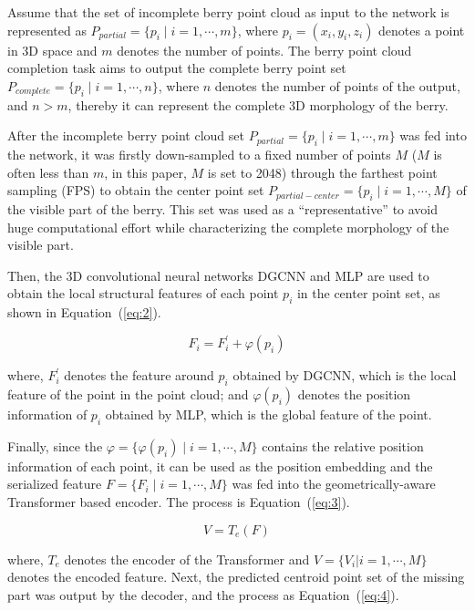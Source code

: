 \documentclass[12pt]{article}
\begin{document}
Assume that the set of incomplete berry point cloud as input to the network is represented as $P_{partial}=\{p_i \mid i=1, \cdots, m \}$, where $p_i=(x_i,y_i,z_i)$ denotes a point in 3D space and $m$ denotes the number of points. 
The berry point cloud completion task aims to output the complete berry point set $P_{complete}=\{p_i \mid i=1, \cdots, n\}$, where $n$ denotes the number of points of the output, and $n > m$, thereby it can represent the complete 3D morphology of the berry.

After the incomplete berry point cloud set $P_{partial}=\{p_i \mid i=1,\cdots,m\}$ was fed into the network, it was firstly down-sampled to a fixed number of points $M$ ($M$ is often less than $m$, in this paper, $M$ is set to 2048) through the farthest point sampling (FPS) to obtain the center point set $P_{partial-center}=\{p_i \mid i=1, \cdots, M\}$ of the visible part of the berry. 
This set was used as a ``representative'' to avoid huge computational effort while characterizing the complete morphology of the visible part.

Then, the 3D convolutional neural networks DGCNN \citep{wang_dynamic_2019} and MLP \citep{tolstikhin_mlpmixer_2021} are used to obtain the local structural features of each point $p_i$ in the center point set, as shown in Equation~(\ref{eq:2}).

\begin{equation}
    F_i = F_{i}^{'} + \varphi(p_i)
    \label{eq:2}
\end{equation}

{\raggedright where, $F_{i}^{'}$ denotes the feature around $p_i$ obtained by DGCNN, which is the local feature of the point in the point cloud; and $\varphi(p_i)$ denotes the position information of $p_i$ obtained by MLP, which is the global feature of the point.}

Finally, since the $\varphi = \{ \varphi(p_i) \mid i=1, \cdots, M \}$ contains the relative position information of each point, it can be used as the position embedding and the serialized feature $F = \{F_i \mid i=1, \cdots, M \}$ was fed into the geometrically-aware Transformer \citep{vaswani_attention_2017} based encoder. 
The process is Equation~(\ref{eq:3}).

\begin{equation}
    V = T_e(F)
    \label{eq:3}
\end{equation}

{\raggedright where, $T_e$ denotes the encoder of the Transformer and $V=\{V_i |i=1, \cdots, M\}$ denotes the encoded feature. 
Next, the predicted centroid point set of the missing part was output by the decoder, and the process as Equation~(\ref{eq:4}).}
\end{document}
